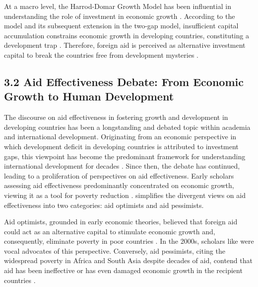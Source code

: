At a macro level, the Harrod-Domar Growth Model has been influential in understanding the role of investment in economic growth \parencite{asimakopulos1986harrod}. According to the model and its subsequent extension in the two-gap model, insufficient capital accumulation constrains economic growth in developing countries, constituting a development trap  \parencite[see][]{temple_aid_2010}. Therefore, foreign aid is perceived as alternative investment capital to break the countries free from development mysteries \parencite{sachs_case_2014, staicu2017study, temple_aid_2010}.

\subsection*{3.2 Aid Effectiveness Debate: From Economic Growth to Human Development}

The discourse on aid effectiveness in fostering growth and development in developing countries has been a longstanding and debated topic within academia and international development. Originating from an economic perspective in which development deficit in developing countries is attributed to investment gaps, this viewpoint has become the predominant framework for understanding international development for decades \parencite{thuong_impact_2020}. Since then, the debate has continued, leading to a proliferation of perspectives on aid effectiveness. Early scholars assessing aid effectiveness predominantly concentrated on economic growth, viewing it as a tool for poverty reduction \parencite[see][]{yontcheva_macroeconomic_2006}. \textcite{nwude_official_2020} simplifies the divergent views on aid effectiveness into two categories: aid optimists and aid pessimists. 

Aid optimists, grounded in early economic theories, believed that foreign aid could act as an alternative capital to stimulate economic growth and, consequently, eliminate poverty in poor countries \parencite{temple_aid_2010}. In the 2000s, scholars like \textcite{sachs_case_2014, sachs_geography_2001} were vocal advocates of this perspective. Conversely, aid pessimists, citing the widespread poverty in Africa and South Asia despite decades of aid, contend that aid has been ineffective or has even damaged economic growth in the recipient countries \parencite{easterly_aid_2004, easterly_are_2007, easterly_can_2009}.

